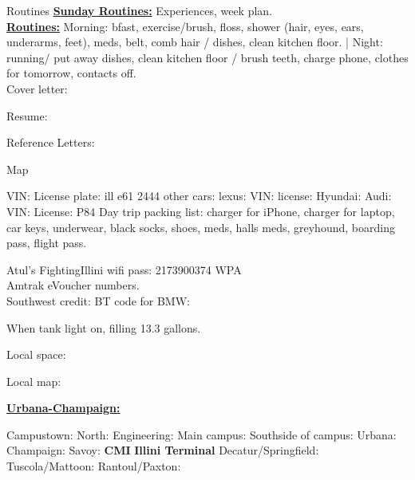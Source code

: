 \documentclass[serif, mathserif, final]{beamer}
\begin{document}
\begin{frame}
  \begin{columns}
    \begin{column}{0.25\linewidth} %
     
      \begin{block}{Routines} 
        \textbf{\underline{Sunday Routines:}} Experiences, week plan. \\ 
        \textbf{\underline{Routines:}} Morning: bfast, exercise/brush, floss, shower (hair, eyes,
        ears, underarms, feet), meds, belt, comb hair / dishes, clean kitchen
        floor. |  Night: running/ put away dishes, clean kitchen floor / brush
        teeth, charge phone, clothes for tomorrow, contacts off. \\
        
        Cover letter: 
        
        Resume: 
        
        Reference Letters:  

      \end{block} 
    

\begin{block}{Map} 

        VIN:  License plate: ill e61 2444   other cars: lexus:  VIN:  license:
        Hyundai: 
        Audi: VIN:  License: P84 
        Day trip packing list: charger for iPhone, charger for laptop, car
        keys, underwear, black socks, shoes, meds, halls meds, greyhound,
        boarding pass, flight pass. 
        
        Atul’s FightingIllini  wifi pass:  2173900374 WPA  \\
        Amtrak  eVoucher numbers. \\
        Southwest credit:
        BT code for BMW:
        
        When tank light on, filling 13.3 gallons.



Local space: 

Local map: 

\textbf{\underline{Urbana-Champaign:}}


Campustown: 
  North: Engineering: 
  Main campus: 
  Southside of campus: 
Urbana: 
Champaign: 
Savoy: 
\textbf{CMI} 
\textbf{Illini Terminal} 
Decatur/Springfield: 
Tuscola/Mattoon: 
Rantoul/Paxton: 
\end{block}
  

\end{column}
\end{columns}
\end{frame}
\end{document}
